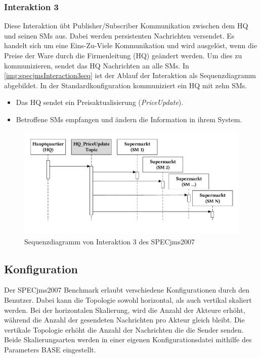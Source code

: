 \subsubsection{Interaktion 3}
\label{sec:interaction3desc}
Diese Interaktion übt Publisher/Subscriber Kommunikation zwischen dem HQ und seinen SMs aus. Dabei werden persistenten Nachrichten versendet. Es handelt sich um eine Eins-Zu-Viele Kommunikation und wird ausgelöst, wenn die Preise der Ware durch die Firmenleitung (HQ) geändert werden. Um dies zu kommunizieren, sendet das HQ Nachrichten an alle SMs. In \autoref{img:specjmsInteraction3seq} ist der Ablauf der Interaktion als Sequenzdiagramm abgebildet. In der Standardkonfiguration kommuniziert ein HQ mit zehn SMs.
\begin{itemize}
    \item Das HQ sendet ein Preisaktualisierung (\emph{PriceUpdate}).
    \item Betroffene SMs empfangen und ändern die Information in ihrem System.
\end{itemize}


\begin{figure}
\center
  \includegraphics[width=1\textwidth]{images/evaluation/specjms/evaluationInteraktion3seq.pdf}
  \caption{Sequenzdiagramm von Interaktion 3 des SPECjms2007}
  \label{img:specjmsInteraction3seq}
\end{figure}


\subsection{Konfiguration}
Der SPECjms2007 Benchmark erlaubt verschiedene Konfigurationen durch den Benutzer. Dabei kann die Topologie sowohl horizontal, als auch vertikal skaliert werden. Bei der horizontalen Skalierung, wird die Anzahl der Akteure erhöht, während die Anzahl der gesendeten Nachrichten pro Akteur gleich bleibt. Die vertikale Topologie erhöht die Anzahl der Nachrichten die die Sender senden. Beide Skalierungsarten werden in einer eigenen Konfigurationsdatei mithilfe des Parameters BASE eingestellt.


